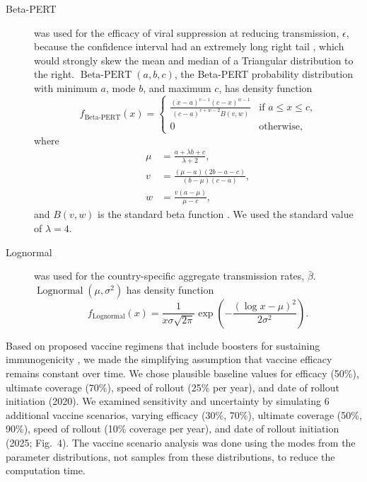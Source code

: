 \documentclass{article}
\DeclareMathOperator{\Lognormal}{Lognormal}
\DeclareMathOperator{\BetaPERT}{Beta-PERT}
\begin{document}
\begin{description}
\item[Beta-PERT] was used for the efficacy of viral suppression at
  reducing transmission, $\epsilon$, because the confidence interval
  had an extremely long right tail \cite{Donnell2010-xo}, which would
  strongly skew the mean and median of a Triangular distribution to
  the right.  $\BetaPERT(a, b, c)$, the Beta-PERT probability
  distribution \cite{malcom1959} with minimum $a$, mode $b$, and
  maximum $c$, has density function
  \begin{equation}
    \label{BetaPERT}
    f_{\BetaPERT}(x) =
    \begin{cases}
      \frac{(x - a)^{v - 1} (c - x)^{w - 1}}{(c - a)^{v + w - 2} B(v, w)}
      & \text{if $a \leq x \leq c$,}
      \\
      0 & \text{otherwise,}
    \end{cases}
  \end{equation}
  where
  \begin{equation}
    \begin{split}
      \mu &= \frac{a + \lambda b + c}{\lambda + 2},
      \\
      v &= \frac{(\mu - a)(2 b - a - c)}{(b - \mu) (c - a)},
      \\
      w &= \frac{v (a - \mu)}{\mu - c},
    \end{split}
  \end{equation}
  and $B(v, w)$ is the standard beta function
  \cite[\S6.2]{davis1972}.
  We used the standard value of $\lambda = 4$.

\item[Lognormal] was used for the country-specific aggregate
  transmission rates, $\bar{\beta}$.  $\Lognormal(\mu, \sigma^2)$
  has density function
  \begin{equation}
    f_{\Lognormal}(x) = \frac{1}{x \sigma \sqrt{2 \pi}}
    \exp\left(- \frac{\left(\log x - \mu\right)^2}{2 \sigma^2}\right).
  \end{equation}
\end{description}

Based on proposed vaccine regimens that include boosters for
sustaining immunogenicity \cite{gray_2016}, we made the simplifying
assumption that vaccine efficacy remains constant over time. We chose
plausible baseline values for efficacy (50\%), ultimate coverage
(70\%), speed of rollout (25\% per year), and date of rollout
initiation (2020). We examined sensitivity and uncertainty by
simulating 6 additional vaccine scenarios, varying efficacy (30\%,
70\%), ultimate coverage (50\%, 90\%), speed of rollout (10\% coverage
per year), and date of rollout initiation (2025; Fig.~4). The vaccine
scenario analysis was done using the modes from the parameter
distributions, not samples from these distributions, to reduce the
computation time.




\end{document}
